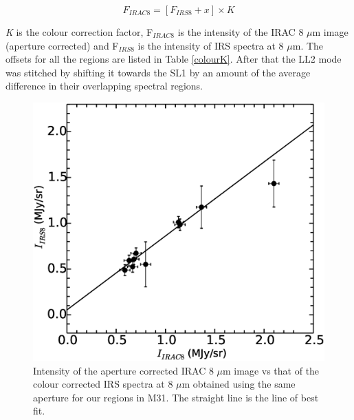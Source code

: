 \documentclass[useAMS,usenatbib,a4paper]{mn2e}
\begin{document}
\begin{equation}
F_{IRAC8} = [ F_{IRS8} + x ] \times K
\end{equation}
\footnotesize
\normalsize

	
	{\em K} is the colour correction factor, F$_{IRAC8}$ is the intensity of the IRAC 8 $\mu$m image (aperture corrected) and F$_{IRS8}$ is the intensity of IRS spectra at 8 $\mu$m. The offsets for all the regions are listed in Table \ref{colourK}. After that the LL2 mode was stitched by shifting it towards the SL1 by an amount of the average difference in their overlapping spectral regions.	
	
	
\begin{figure}
\centering
\includegraphics[scale=0.25]{./offset.eps}
\caption{ Intensity of the aperture corrected IRAC 8 $\mu$m image vs that of the colour corrected IRS spectra at 8 $\mu$m  obtained using the same aperture for our regions in M31. The straight line is the line of best fit. }
\label{offset}
\end{figure}
\end{document}
